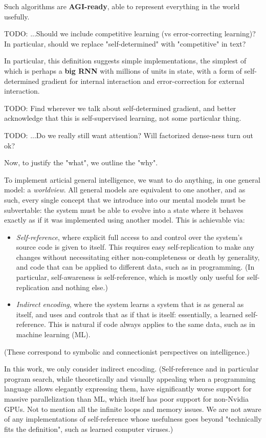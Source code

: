 \documentclass{article}
\begin{document}
Such algorithms are \textbf{AGI-ready}, able to represent everything in the world usefully.

    TODO: ...Should we include competitive learning (vs error-correcting learning)? In particular, should we replace "self-determined" with "competitive" in text?

In particular, this definition suggests simple implementations, the simplest of which is perhaps a \textbf{big RNN} with millions of units in state, with a form of self-determined gradient for internal interaction and error-correction for external interaction.

    TODO: Find wherever we talk about self-determined gradient, and better acknowledge that this is self-supervised learning, not some particular thing.

    TODO: ...Do we really still want attention? Will factorized dense-ness turn out ok?

Now, to justify the "what", we outline the "why".

To implement articial general intelligence, we want to do anything, in one general model: a \textit{worldview}. All general models are equivalent to one another, and as such, every single concept that we introduce into our mental models must be subvertable: the system must be able to evolve into a state where it behaves exactly as if it was implemented using another model. This is achievable via:

\begin{itemize}
\item \textit{Self-reference}, where explicit full access to and control over the system's source code is given to itself. This requires easy self-replication to make any changes without necessitating either non-completeness or death by generality, and code that can be applied to different data, such as in programming. (In particular, self-awareness is self-reference, which is mostly only useful for self-replication and nothing else.)
\item \textit{Indirect encoding}, where the system learns a system that is as general as itself, and uses and controls that as if that is itself: essentially, a learned self-reference. This is natural if code always applies to the same data, such as in machine learning (ML).
\end{itemize}

(These correspond to symbolic and connectionist perspectives on intelligence.)

In this work, we only consider indirect encoding. (Self-reference and in particular program search, while theoretically and visually appealing when a programming language allows elegantly expressing them, have significantly worse support for massive parallelization than ML, which itself has poor support for non-Nvidia GPUs. Not to mention all the infinite loops and memory issues. We are not aware of any implementations of self-reference whose usefulness goes beyond "technically fits the definition", such as learned computer viruses.)
\end{document}
